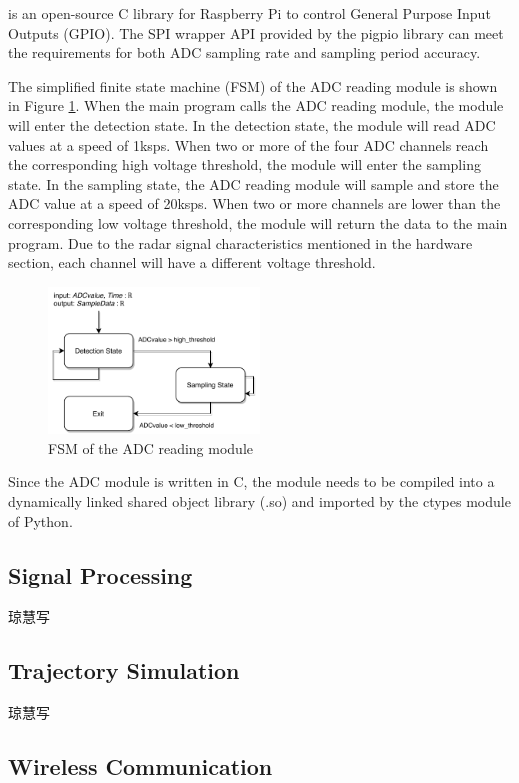 \textcite{pigiop} is an open-source C library for Raspberry Pi to control General Purpose Input Outputs (GPIO). The SPI wrapper API provided by the pigpio library can meet the requirements for both ADC sampling rate and sampling period accuracy.
\par
The simplified finite state machine (FSM) of the ADC reading module is shown in Figure \ref{fig:adc_module}. When the main program calls the ADC reading module, the module will enter the detection state. In the detection state, the module will read ADC values at a speed of 1ksps. When two or more of the four ADC channels reach the corresponding high voltage threshold, the module will enter the sampling state. In the sampling state, the ADC reading module will sample and store the ADC value at a speed of 20ksps. When two or more channels are lower than the corresponding low voltage threshold, the module will return the data to the main program. Due to the radar signal characteristics mentioned in the hardware section, each channel will have a different voltage threshold.
\begin{figure}[H]
    \centering
    \includegraphics[width=0.5\textwidth]{figure/SPI.pdf}
    \caption{FSM of the ADC reading module}
    \label{fig:adc_module}
\end{figure}
Since the ADC module is written in C, the module needs to be compiled into a dynamically linked shared object library (.so) and imported by the ctypes module of Python.



\subsection{Signal Processing}
琼慧写
\subsection{Trajectory Simulation}
琼慧写
\subsection{Wireless Communication}

